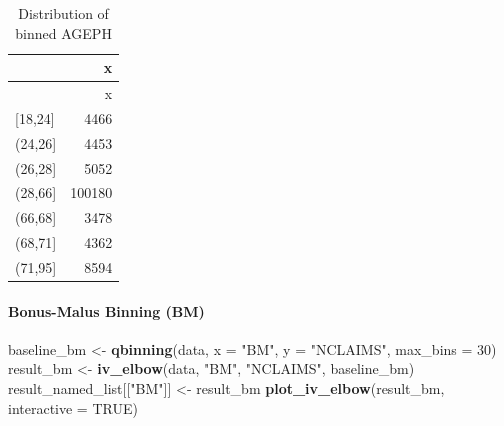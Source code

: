 \documentclass[
  english,
  11pt,
]{article}
\newenvironment{Shaded}{\begin{snugshade}}{\end{snugshade}}
\newcommand{\AttributeTok}[1]{\textcolor[rgb]{0.13,0.29,0.53}{#1}}
\newcommand{\CommentTok}[1]{\textcolor[rgb]{0.56,0.35,0.01}{\textit{#1}}}
\newcommand{\ConstantTok}[1]{\textcolor[rgb]{0.56,0.35,0.01}{#1}}
\newcommand{\DecValTok}[1]{\textcolor[rgb]{0.00,0.00,0.81}{#1}}
\newcommand{\FunctionTok}[1]{\textcolor[rgb]{0.13,0.29,0.53}{\textbf{#1}}}
\newcommand{\NormalTok}[1]{#1}
\newcommand{\OtherTok}[1]{\textcolor[rgb]{0.56,0.35,0.01}{#1}}
\newcommand{\SpecialCharTok}[1]{\textcolor[rgb]{0.81,0.36,0.00}{\textbf{#1}}}
\newcommand{\StringTok}[1]{\textcolor[rgb]{0.31,0.60,0.02}{#1}}
\begin{document}
\begin{Shaded}
\end{Shaded}

\begin{longtable}[]{@{}lr@{}}
\caption{Distribution of binned AGEPH}\tabularnewline
\toprule\noalign{}
& x \\
\midrule\noalign{}
\endfirsthead
\toprule\noalign{}
& x \\
\midrule\noalign{}
\endhead
\bottomrule\noalign{}
\endlastfoot
{[}18,24{]} & 4466 \\
(24,26{]} & 4453 \\
(26,28{]} & 5052 \\
(28,66{]} & 100180 \\
(66,68{]} & 3478 \\
(68,71{]} & 4362 \\
(71,95{]} & 8594 \\
\end{longtable}

\paragraph{Bonus-Malus Binning (BM)}\label{bonus-malus-binning-bm}

\begin{Shaded}
\begin{Highlighting}[]
\NormalTok{baseline\_bm }\OtherTok{\textless{}{-}} \FunctionTok{qbinning}\NormalTok{(data, }\AttributeTok{x =} \StringTok{"BM"}\NormalTok{, }\AttributeTok{y =} \StringTok{"NCLAIMS"}\NormalTok{, }\AttributeTok{max\_bins =} \DecValTok{30}\NormalTok{)}
\NormalTok{result\_bm }\OtherTok{\textless{}{-}} \FunctionTok{iv\_elbow}\NormalTok{(data, }\StringTok{"BM"}\NormalTok{, }\StringTok{"NCLAIMS"}\NormalTok{, baseline\_bm)}
\NormalTok{result\_named\_list[[}\StringTok{"BM"}\NormalTok{]] }\OtherTok{\textless{}{-}}\NormalTok{ result\_bm}
\FunctionTok{plot\_iv\_elbow}\NormalTok{(result\_bm, }\AttributeTok{interactive =} \ConstantTok{TRUE}\NormalTok{)}
\end{Highlighting}
\end{Shaded}
\end{document}
